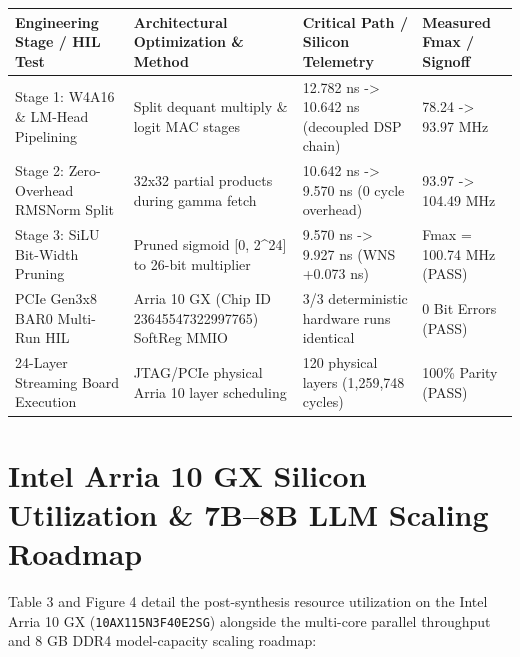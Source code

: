 \documentclass[11pt,a4paper]{article}
\begin{document}
{\footnotesize\renewcommand{\arraystretch}{1.14}\begin{longtable}{@{}L{0.23\textwidth}L{0.27\textwidth}L{0.24\textwidth}L{0.16\textwidth}@{}}\toprule

\textbf{Engineering Stage /\allowbreak{} HIL Test} & \textbf{Architectural Optimization \& Method} & \textbf{Critical Path /\allowbreak{} Silicon Telemetry} & \textbf{Measured Fmax /\allowbreak{} Signoff}\\\midrule\endhead

Stage 1: W4A16 \& LM-Head Pipelining & Split dequant multiply \& logit MAC stages & 12.782 ns -> 10.642 ns (\allowbreak{}decoupled DSP chain)\allowbreak{} & 78.24 -> 93.97 MHz\\[2pt]

Stage 2: Zero-Overhead RMSNorm Split & 32x32 partial products during gamma fetch & 10.642 ns -> 9.570 ns (\allowbreak{}0 cycle overhead)\allowbreak{} & 93.97 -> 104.49 MHz\\[2pt]

Stage 3: SiLU Bit-Width Pruning & Pruned sigmoid [\allowbreak{}0,\allowbreak{} 2\textasciicircum{}24]\allowbreak{} to 26-bit multiplier & 9.570 ns -> 9.927 ns (\allowbreak{}WNS +\allowbreak{}0.073 ns)\allowbreak{} & Fmax =\allowbreak{} 100.74 MHz (\allowbreak{}PASS)\allowbreak{}\\[2pt]

PCIe Gen3x8 BAR0 Multi-Run HIL & Arria 10 GX (\allowbreak{}Chip ID 23645547\allowbreak{}32299776\allowbreak{}5)\allowbreak{} SoftReg MMIO & 3/\allowbreak{}3 deterministic hardware runs identical & 0 Bit Errors (\allowbreak{}PASS)\allowbreak{}\\[2pt]

24-Layer Streaming Board Execution & JTAG/\allowbreak{}PCIe physical Arria 10 layer scheduling & 120 physical layers (\allowbreak{}1,\allowbreak{}259,\allowbreak{}748 cycles)\allowbreak{} & 100\% Parity (\allowbreak{}PASS)\allowbreak{}\\[2pt]

\bottomrule\end{longtable}}

\section{Intel Arria 10 GX Silicon Utilization \& 7B--8B LLM Scaling Roadmap}

Table 3 and Figure 4 detail the post-synthesis resource utilization on the Intel Arria 10 GX (\texttt{10AX115N3F40E2SG}) alongside the multi-core parallel throughput and 8 GB DDR4 model-capacity scaling roadmap:
\end{document}

